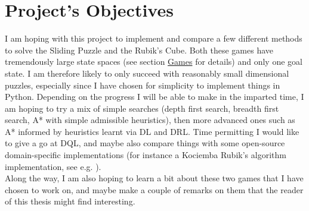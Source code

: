 

\section{Project's Objectives}

I am hoping with this project to implement and compare a few different methods to solve the Sliding Puzzle and the Rubik's Cube. Both these games have tremendously large state spaces (see section \hyperref[sec:Games]{Games} for details) and only one goal state. I am therefore likely to only succeed with reasonably small dimensional puzzles, especially since I have chosen for simplicity to implement things in Python.
Depending on the progress I will be able to make in the imparted time, I am hoping to try a mix of simple searches (depth first search, breadth first search, A* with simple admissible heuristics), then more advanced ones such as A* informed by heuristics learnt via DL and DRL. Time permitting I would like to give a go at DQL, and maybe also compare things with some open-source domain-specific implementations (for instance a Kociemba Rubik's algorithm implementation, see e.g. \cite{Kociemba}).
\\
Along the way, I am also hoping to learn a bit about these two games that I have chosen to work on, and maybe make a couple of remarks on them that the reader of this thesis might find interesting.
